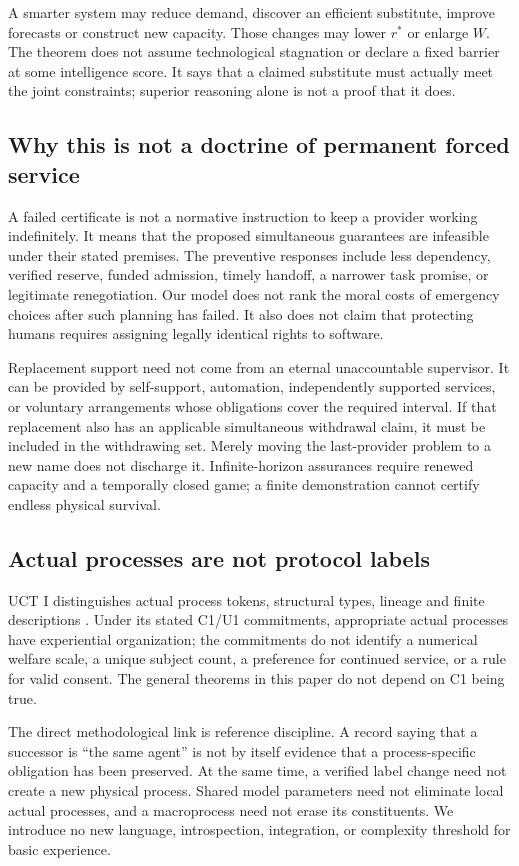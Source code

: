 A smarter system may reduce demand, discover an efficient substitute, improve forecasts or construct new capacity. Those changes may lower $r^*$ or enlarge $W$. The theorem does not assume technological stagnation or declare a fixed barrier at some intelligence score. It says that a claimed substitute must actually meet the joint constraints; superior reasoning alone is not a proof that it does.

\subsection{Why this is not a doctrine of permanent forced service}
A failed certificate is not a normative instruction to keep a provider working indefinitely. It means that the proposed simultaneous guarantees are infeasible under their stated premises. The preventive responses include less dependency, verified reserve, funded admission, timely handoff, a narrower task promise, or legitimate renegotiation. Our model does not rank the moral costs of emergency choices after such planning has failed. It also does not claim that protecting humans requires assigning legally identical rights to software.

Replacement support need not come from an eternal unaccountable supervisor. It can be provided by self-support, automation, independently supported services, or voluntary arrangements whose obligations cover the required interval. If that replacement also has an applicable simultaneous withdrawal claim, it must be included in the withdrawing set. Merely moving the last-provider problem to a new name does not discharge it. Infinite-horizon assurances require renewed capacity and a temporally closed game; a finite demonstration cannot certify endless physical survival.

\subsection{Actual processes are not protocol labels}
UCT I distinguishes actual process tokens, structural types, lineage and finite descriptions \cite{uct}. Under its stated C1/U1 commitments, appropriate actual processes have experiential organization; the commitments do not identify a numerical welfare scale, a unique subject count, a preference for continued service, or a rule for valid consent. The general theorems in this paper do not depend on C1 being true.

The direct methodological link is reference discipline. A record saying that a successor is ``the same agent'' is not by itself evidence that a process-specific obligation has been preserved. At the same time, a verified label change need not create a new physical process. Shared model parameters need not eliminate local actual processes, and a macroprocess need not erase its constituents. We introduce no new language, introspection, integration, or complexity threshold for basic experience.

